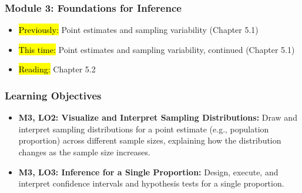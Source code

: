 
\begin{frame}
    \frametitle{Module 3: Foundations for Inference}
    \begin{itemize}
        \item \hl{Previously: }Point estimates and sampling variability (Chapter 5.1)
        \item \hl{This time: }Point estimates and sampling variability, continued (Chapter 5.1)
        \item \hl{Reading: }Chapter 5.2
    \end{itemize}

\end{frame}
\begin{frame}
    \frametitle{Learning Objectives}
    \begin{itemize}
        \item \textbf{M3, LO2: Visualize and Interpret Sampling Distributions:} Draw and interpret sampling distributions for a point estimate (e.g., population proportion) across different sample sizes, explaining how the distribution changes as the sample size increases.
        \item \textbf{M3, LO3: Inference for a Single Proportion:} Design, execute, and interpret confidence intervals and hypothesis tests for a single proportion.
    \end{itemize}
\end{frame}
